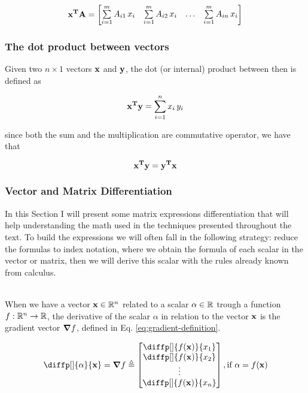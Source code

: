 \documentclass[12pt]{article}
\begin{document}
\begin{equation}
    \boldsymbol{\mathbf{x^T}} \boldsymbol{\mathbf{A}} = \begin{bmatrix}
        \sum\limits_{i = 1}^{m} A_{i1} \, x_i &
        \sum\limits_{i = 1}^{m} A_{i2} \, x_i & \dots &
        \sum\limits_{i = 1}^{m} A_{in} \, x_i
    \end{bmatrix}
    \label{eq:vector-matrix-multiplication}
\end{equation}

\subsubsection{The dot product between vectors}
Given two $n\times 1$ vectors $\boldsymbol{\mathbf{x}}$ and $\boldsymbol{\mathbf{y}}$, the dot (or internal) product between then is defined as

\begin{equation}
    \boldsymbol{\mathbf{x^T}}\boldsymbol{\mathbf{y}} = \sum\limits_{i = 1}^{n} x_i\,y_i
    \label{eq:dot-product}
\end{equation}

since both the sum and the multiplication are commutative operator, we have that

\begin{equation}
    \boldsymbol{\mathbf{x^T}}\boldsymbol{\mathbf{y}} = \boldsymbol{\mathbf{y^T}}\boldsymbol{\mathbf{x}}
\end{equation}
\subsubsection{Vector and Matrix Differentiation}
In this Section I will present some matrix expressions differentiation that will help understanding the math used in the techniques presented throughout the text. To build the expressions we will often fall in the following strategy: reduce the formulas to index notation, where we obtain the formula of each scalar in the vector or matrix, then we will derive this scalar with the rules already known from calculus.

\\
When we have a vector $\boldsymbol{\mathbf{x}} \in \mathbb{R}^n$ related to a scalar $\alpha \in \mathbb{R}$ trough a function $f: \mathbb{R}^n \to \mathbb{R}$, the derivative of the scalar $\alpha$ in relation to the vector $\boldsymbol{\mathbf{x}}$ is the gradient vector $\grad{f}$, defined in Eq. \ref{eq:gradient-definition}.

\renewcommand{\arraystretch}{1.5}
\begin{equation}
    \diffp[]{\alpha}{\bvec{x}} = \grad{f} \triangleq \begin{bmatrix}
        \diffp[]{f(\bvec{x})}{x_1} \\
        \diffp[]{f(\bvec{x})}{x_2} \\
        \vdots \\
        \diffp[]{f(\bvec{x})}{x_n} \\
    \end{bmatrix}, \text{if $\alpha = f(\bvec{x})$}
    \label{eq:gradient-definition}
\end{equation}
\renewcommand{\arraystretch}{1.0}
\end{document}

